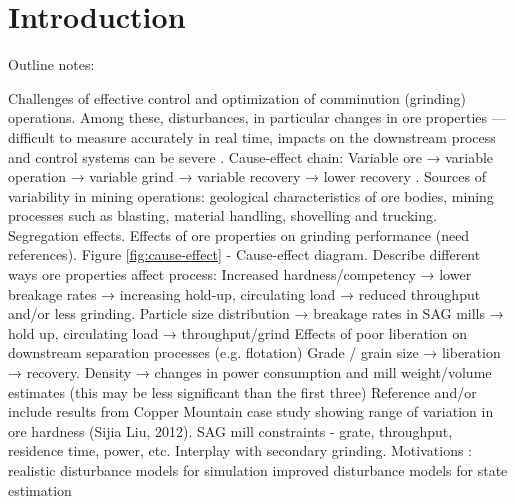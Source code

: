 \chapter*{Introduction}         %
\label{chap-introduction}       %


Outline notes:

\begin{outline}
	\1 Challenges of effective control and optimization of comminution (grinding) operations.
	\1 Among these, disturbances, in particular changes in ore properties — difficult to measure accurately in real time, impacts on the downstream process and control systems can be severe \citep{herbst_optimal_1988}.
	\1 Cause-effect chain: Variable ore → variable operation → variable grind → variable recovery → lower recovery \citep{powell_applying_2009}.
	\1 Sources of variability in mining operations: geological characteristics of ore bodies, mining processes such as blasting, material handling, shovelling and trucking. Segregation effects.
	\1 Effects of ore properties on grinding performance (need references).
	\1 Figure \ref{fig:cause-effect} - Cause-effect diagram.  Describe different ways ore properties affect process:
	\2 Increased hardness/competency → lower breakage rates → increasing hold-up, circulating load → reduced throughput and/or less grinding.
	\2 Particle size distribution → breakage rates in SAG mills → hold up, circulating load → throughput/grind
	\2 Effects of poor liberation on downstream separation processes (e.g. flotation)
	\2 Grade / grain size → liberation → recovery.
	\2 Density → changes in power consumption and mill weight/volume estimates (this may be less significant than the first three)
	\1 Reference and/or include results from Copper Mountain case study showing range of variation in ore hardness (Sijia Liu, 2012).
	\1 SAG mill constraints - grate, throughput, residence time, power, etc. Interplay with secondary grinding.
	\1 Motivations :
	\2 realistic disturbance models for simulation
	\2 improved disturbance models for state estimation
\end{outline}


